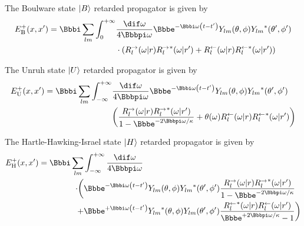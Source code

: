 \begin{nameddef}{The Boulware state}
$\Ket{B}$ \cite{PhysRevD.11.1404} retarded propagator is given by
\begin{equation}
\begin{split}
\rfun{E_\text{B}^+}{x, x'} = \ii\sum_{lm}\int_0^{+\infty}
&\frac{\dif\omega}{4\pp\omega}\ee^{-\ii\omega\rbr{t-t'}}
\rfun{Y_{lm}}{\theta,\phi}\rfun{{Y_{lm}}^*}{\theta ',\phi '} \\
&\cdot\rbr{\rfun{R_l^{\rightarrow}}{\omega\middle| r}
\rfun{{R_l^{\rightarrow}}^*}{\omega\middle| r'} + 
\rfun{R_l^{\leftarrow}}{\omega\middle| r}
\rfun{{R_l^{\leftarrow}}^*}{\omega\middle| r'}}
\end{split}
\end{equation}
\label{nmd:boulware_state}
\end{nameddef}

\begin{nameddef}{The Unruh state}
$\Ket{U}$ \cite{PhysRevD.14.870} retarded propagator is given by
\begin{equation}
\begin{split}
\rfun{E_\text{U}^+}{x, x'} = \ii\sum_{lm}\int_{-\infty}^{+\infty}
&\frac{\dif\omega}{4\pp\omega}\ee^{-\ii\omega\rbr{t-t'}}
\rfun{Y_{lm}}{\theta,\phi}\rfun{{Y_{lm}}^*}{\theta ',\phi '} \\
&\rbr{\frac{\rfun{R_l^{\rightarrow}}{\omega\middle| r}
\rfun{{R_l^{\rightarrow}}^*}{\omega\middle| r'}}{1-\ee^{-2\pp\omega/\kappa}} +
\rfun{\theta}{\omega}\rfun{R_l^{\leftarrow}}{\omega\middle| r}
\rfun{{R_l^{\leftarrow}}^*}{\omega\middle| r'}}
\end{split}
\end{equation}
\label{nmd:unruh_state}
\end{nameddef}

\begin{nameddef}{The Hartle-Hawking-Israel state}
$\Ket{H}$ \cite{PhysRevD.13.2188, ISRAEL1976107} retarded propagator is given by
\begin{equation}
\begin{split}
\rfun{E_\text{H}^+}{x, x'} =
 \ii \sum_{lm} & \int_{-\infty}^{+\infty}\frac{\dif\omega}{4\pp\omega} \\
\cdot\biggl( & \ee^{-\ii\omega\rbr{t-t'}}
\rfun{Y_{lm}}{\theta,\phi}\rfun{{Y_{lm}}^*}{\theta ',\phi '}
\frac{\rfun{R_l^{\rightarrow}}{\omega\middle| r}
\rfun{{R_l^{\rightarrow}}^*}{\omega\middle| r'}}{1-\ee^{-2\pp\omega/\kappa}}
\\
+ & \ee^{+\ii\omega\rbr{t-t'}}
\rfun{{Y_{lm}}^*}{\theta,\phi}\rfun{Y_{lm}}{\theta ',\phi '}
\frac{\rfun{{R_l^{\leftarrow}}^*}{\omega\middle| r}
\rfun{R_l^{\leftarrow}}{\omega\middle| r'}}{\ee^{+2\pp\omega/\kappa}-1}
\biggr) \\
\end{split}
\end{equation}
\label{nmd:hhi_state}
\end{nameddef}

